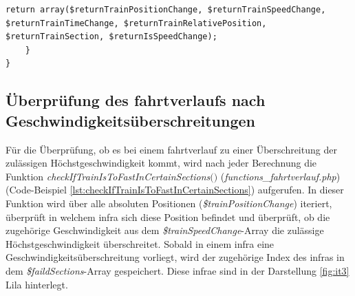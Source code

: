 \begin{lstlisting}[caption={\textit{createTrainChanges$($$)$} (\textit{functions\_fahrtverlauf.php})},captionpos=b,label={lst:createTrainChanges}]
		return array($returnTrainPositionChange, $returnTrainSpeedChange, $returnTrainTimeChange, $returnTrainRelativePosition, $returnTrainSection, $returnIsSpeedChange);
	}
}
\end{lstlisting}
\subsection{Überprüfung des \Gls{fahrtverlauf}s nach Geschwindigkeitsüberschreitungen} \label{überprüfung}
Für die Überprüfung, ob es bei einem \Gls{fahrtverlauf} zu einer Überschreitung der zulässigen Höchstgeschwindigkeit kommt, wird nach jeder Berechnung die Funktion \textit{check\-If\-Train\-Is\-To\-Fast\-In\-Certain\-Sec\-tions$($$)$} (\textit{functions\_fahrtverlauf.php}) (Code-Beispiel \ref{lst:checkIfTrainIsToFastInCertainSections}) aufgerufen. In dieser Funktion wird über alle absoluten Positionen (\textit{\$trainPositionChange}) iteriert, überprüft in welchem \ac{infra} sich diese Position befindet und überprüft, ob die zugehörige Geschwindigkeit aus dem \textit{\$trainSpeedChange}-Array die zulässige Höchstgeschwindigkeit überschreitet. Sobald in einem \ac{infra} eine Geschwindigkeitsüberschreitung vorliegt, wird der zugehörige Index des \ac{infra}s in dem \textit{\$faildSections}-Array gespeichert. Diese \ac{infra}e sind in der Darstellung \ref{fig:it3} Lila hinterlegt. 

